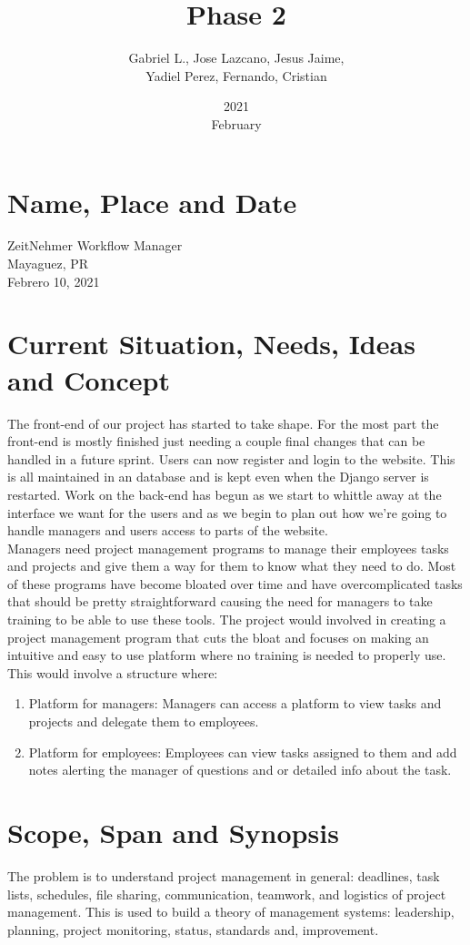 \documentclass{article}[draft]
\title{Phase 2}
\date{2021\\February}
\author{Gabriel L., Jose Lazcano, Jesus Jaime,\\ Yadiel Perez, Fernando, Cristian}
\begin{document}
\maketitle
\section{Name, Place and Date}
ZeitNehmer Workflow Manager\\
Mayaguez, PR\\
Febrero 10, 2021
\section{Current Situation, Needs, Ideas and Concept}
\vspace{10pt}
The front-end of our project has started to take shape. For the most part the front-end is mostly finished just needing a couple final changes that can be handled in a future sprint. Users can now register and login to the website. This is all maintained in an database and is kept even when the Django server is restarted. Work on the back-end has begun as we start to whittle away at the interface we want for the users and as we begin to plan out how we're going to handle managers and users access to parts of the website.
\\

Managers need project management programs to manage their employees tasks and projects and give them a way for them to know what they need to do. Most of these programs have become bloated over time and have overcomplicated tasks that should be pretty straightforward causing the need for managers to take training to be able to use these tools. The project would involved in creating a project management program that cuts the bloat and focuses on making an intuitive and easy to use platform where no training is needed to properly use. This would involve a structure where:
\begin{enumerate}
\item Platform for managers: Managers can access a platform to view tasks and projects and delegate them to employees.
\item Platform for employees: Employees can view tasks assigned to them and add notes alerting the manager of questions and or detailed info about the task.
\end{enumerate}
\section{Scope, Span and Synopsis}
\vspace{10pt}
The problem is to understand project management in general: deadlines, task lists, schedules, file sharing, communication, teamwork, and logistics of project management. This is used to build a theory of management systems: leadership, planning, project monitoring, status, standards and, improvement.
\end{document}

